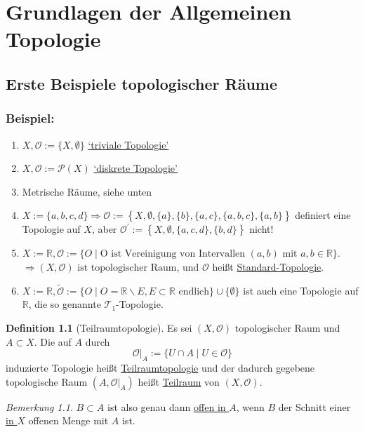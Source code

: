 \documentclass[a4paper,11pt,notitlepage]{report}
\theoremstyle{remark}
\newtheorem{remark}{Bemerkung}[chapter]
\theoremstyle{definition}
\newtheorem{definition}{Definition}[chapter]
\newcommand{\R}{{\ensuremath{\mathbb{R}}}}
\newcommand{\OO}{{\ensuremath{\mathcal{O}}}}
\newenvironment{bsp}[1]
{
\setlength{\fboxsep}{10pt}
\subsection*{Beispiel: #1}
\begin{upshape}
}
{
\end{upshape}
}
\begin{document}
\newpage
\chapter{Grundlagen der Allgemeinen Topologie}
\section{Erste Beispiele topologischer Räume}
\begin{bsp}{}
	\begin{enumerate}[(1)]
		\item $X, \OO := \{X, \emptyset\}$ \underline{`triviale Topologie'}
		\item $X, \OO := \mathcal{P}(X)$ \underline{`diskrete Topologie'}
		\item Metrische Räume, siehe unten
		\item $X:= \{a,b,c,d\} \Rightarrow \OO := \left\{X, \emptyset, \{a\}, \{b\}, \{a,c\}, \{a,b,c\}, \{a,b\} \right \}$ definiert eine Topologie auf $X$, aber $\OO^\prime:= \left \{ X, \emptyset, \{a,c,d\}, \{b,d\} \right \}$ nicht!
		\item $X := \R, \OO := \{O \mid \text{O ist Vereinigung von Intervallen } (a,b) \text{ mit } a,b \in \R\}$. $\Rightarrow (X, \OO) \text{ ist topologischer Raum}$, und $\OO$ heißt \underline{Standard-Topologie}.
		\item $X:= \R, \tilde{\OO} := \{O \mid O = \R \backslash E, E \subset \R \text{ endlich}\} \cup \{\emptyset\}$ ist auch eine Topologie auf $\R$, die so genannte $\mathcal{T}_1$-Topologie.
	\end{enumerate}
\end{bsp}

\begin{definition}[Teilraumtopologie]
Es sei $(X, \OO)$ topologischer Raum und $A \subset X$. Die auf $A$ durch
$$\OO \Big |_{A} := \{U \cap A \mid U \in \OO \}$$
induzierte Topologie heißt \underline{Teilraumtopologie} und der dadurch gegebene topologische Raum $(A, \OO \Big |_{A})$ heißt \underline{Teilraum} von $(X, \OO)$.
\end{definition}

\begin{remark}
$B \subset A$ ist also genau dann \underline{offen \underline{in $A$}}, wenn $B$ der Schnitt einer \underline{in $X$} offenen Menge mit $A$ ist.
\end{remark}
\end{document}
